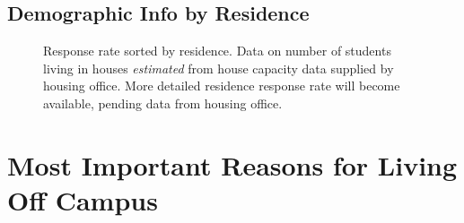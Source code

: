 \documentclass[12pt]{article} %
\begin{document}
\subsection{Demographic Info by Residence}


\begin{figure}[H]
	\caption{Response rate sorted by residence. Data on number of students living in houses \emph{estimated} from house capacity data supplied by housing office. More detailed residence response rate will become available, pending data from housing office.}
\end{figure}


\newpage
\section{Most Important Reasons for Living Off Campus}
\end{document}
